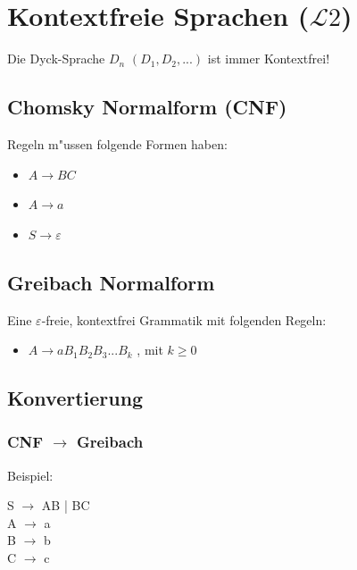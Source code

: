 \documentclass[11pt, a4paper]{scrartcl}
\begin{document}
\newpage


\section{Kontextfreie Sprachen ($\mathcal{L}2 $)}

Die Dyck-Sprache $D_n$ $(D_1, D_2, ...)$ ist immer Kontextfrei!

\subsection{Chomsky Normalform (CNF)}

Regeln m"ussen folgende Formen haben:

\begin{itemize}
    \item $A \rightarrow BC$
    \item $A \rightarrow a$
    \item $S \rightarrow \varepsilon$
\end{itemize}

\subsection{Greibach Normalform}

Eine $\varepsilon$-freie, kontextfrei Grammatik mit folgenden Regeln:

\begin{itemize}
    \item $A \rightarrow aB_1B_2B_3...B_k$ \quad, mit $k \geq 0$
\end{itemize}

\subsection{Konvertierung}

\subsubsection{CNF $\rightarrow$ Greibach}

Beispiel:

\vspace{0.5em}

S $\rightarrow$ AB | BC \\
A $\rightarrow$ a \\
B $\rightarrow$ b \\
C $\rightarrow$ c \\
\end{document}
